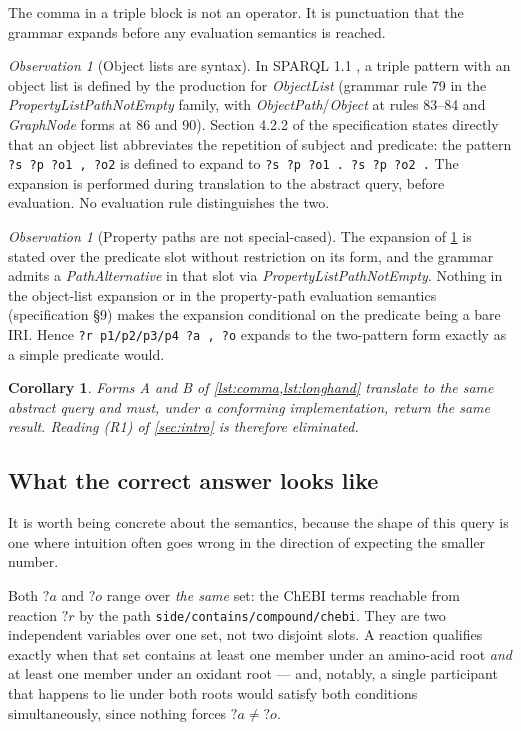 \documentclass[11pt,a4paper]{article}
\theoremstyle{plain}
\newtheorem{corollary}[theorem]{Corollary}
\theoremstyle{definition}
\theoremstyle{remark}
\newtheorem{observation}[theorem]{Observation}
\begin{document}
The comma in a triple block is not an operator. It is punctuation that the
grammar expands before any evaluation semantics is reached.

\begin{observation}[Object lists are syntax]
\label{obs:syntax}
In SPARQL 1.1 \citep{SPARQL11}, a triple pattern with an object list is defined
by the production for \emph{ObjectList} \textup{(}grammar rule 79 in the
\emph{PropertyListPathNotEmpty} family, with \emph{ObjectPath}/\emph{Object}
at rules 83--84 and \emph{GraphNode} forms at 86 and 90\textup{)}. Section
4.2.2 of the specification states directly that an object list abbreviates the
repetition of subject and predicate: the pattern
\texttt{?s ?p ?o1 , ?o2} is defined to expand to
\texttt{?s ?p ?o1 . ?s ?p ?o2 .}
The expansion is performed during translation to the abstract query, before
evaluation. No evaluation rule distinguishes the two.
\end{observation}

\begin{observation}[Property paths are not special-cased]
\label{obs:paths}
The expansion of \cref{obs:syntax} is stated over the predicate slot without
restriction on its form, and the grammar admits a \emph{PathAlternative} in that
slot via \emph{PropertyListPathNotEmpty}. Nothing in the object-list expansion
or in the property-path evaluation semantics (specification §9) makes the
expansion conditional on the predicate being a bare IRI. Hence
\texttt{?r p1/p2/p3/p4 ?a , ?o} expands to the two-pattern form exactly as a
simple predicate would.
\end{observation}

\begin{corollary}
\label{cor:equivalent}
Forms A and B of \cref{lst:comma,lst:longhand} translate to the same abstract
query and must, under a conforming implementation, return the same result.
Reading (R1) of \cref{sec:intro} is therefore eliminated.
\end{corollary}

\subsection{What the correct answer looks like}

It is worth being concrete about the semantics, because the shape of this
query is one where intuition often goes wrong in the direction of expecting the
smaller number.

Both $?a$ and $?o$ range over \emph{the same} set: the ChEBI terms reachable
from reaction $?r$ by the path
\texttt{side/contains/compound/chebi}. They are two independent variables over
one set, not two disjoint slots. A reaction qualifies exactly when that set
contains at least one member under an amino-acid root \emph{and} at least one
member under an oxidant root --- and, notably, a single participant that happens
to lie under both roots would satisfy both conditions simultaneously, since
nothing forces $?a \ne ?o$.
\end{document}
